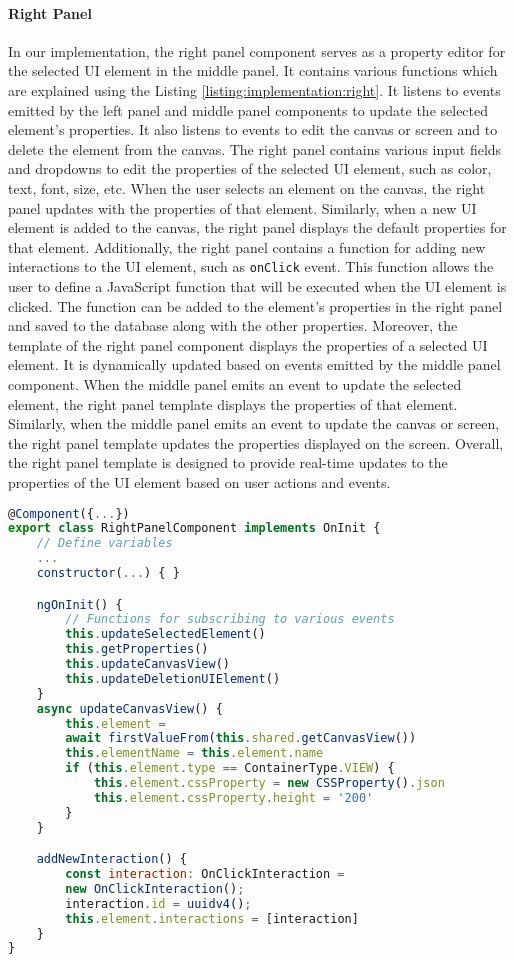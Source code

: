 \paragraph{Right Panel}
In our implementation, the right panel component serves as a property editor for the selected UI element in the middle panel. 
It contains various functions which are explained using the Listing \ref{listing:implementation:right}.
It listens to events emitted by the left panel and middle panel components to update the selected element's properties. 
It also listens to events to edit the canvas or screen and to delete the element from the canvas.
The right panel contains various input fields and dropdowns to edit the properties of the selected UI element, such as color, text, font, size, etc. 
When the user selects an element on the canvas, the right panel updates with the properties of that element. 
Similarly, when a new UI element is added to the canvas, the right panel displays the default properties for that element.
Additionally, the right panel contains a function for adding new interactions to the UI element, such as \texttt{onClick} event. 
This function allows the user to define a JavaScript function that will be executed when the UI element is clicked. 
The function can be added to the element's properties in the right panel and saved to the database along with the other properties.
Moreover, the template of the right panel component displays the properties of a selected UI element. 
It is dynamically updated based on events emitted by the middle panel component. 
When the middle panel emits an event to update the selected element, the right panel template displays the properties of that element. 
Similarly, when the middle panel emits an event to update the canvas or screen, the right panel template updates the properties displayed on the screen. 
Overall, the right panel template is designed to provide real-time updates to the properties of the UI element based on user actions and events.
\clearpage
\begin{lstlisting}[language=JavaScript, caption=right-panel.component.ts, label=listing:implementation:right]
@Component({...})
export class RightPanelComponent implements OnInit {
    // Define variables
    ...
    constructor(...) { }

    ngOnInit() {
        // Functions for subscribing to various events
        this.updateSelectedElement()
        this.getProperties()
        this.updateCanvasView()
        this.updateDeletionUIElement()
    }
    async updateCanvasView() {
        this.element = 
        await firstValueFrom(this.shared.getCanvasView())
        this.elementName = this.element.name
        if (this.element.type == ContainerType.VIEW) {
            this.element.cssProperty = new CSSProperty().json
            this.element.cssProperty.height = '200'
        }
    }

    addNewInteraction() {
        const interaction: OnClickInteraction = 
        new OnClickInteraction();
        interaction.id = uuidv4();
        this.element.interactions = [interaction]
    }
}    
\end{lstlisting}
\clearpage
